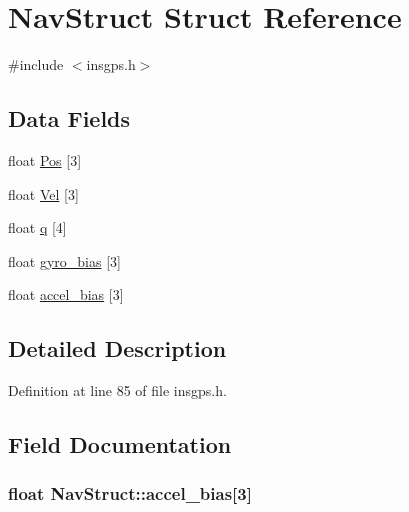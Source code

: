 \hypertarget{struct_nav_struct}{\section{Nav\-Struct Struct Reference}
\label{struct_nav_struct}
}


{\ttfamily \#include $<$insgps.\-h$>$}

\subsection*{Data Fields}
\begin{DoxyCompactItemize}
\item 
float \hyperlink{struct_nav_struct_aedabeb0b4afabbf684e440bb5f3befee}{Pos} \mbox{[}3\mbox{]}
\item 
float \hyperlink{struct_nav_struct_a0bb53e4e617d7bae88f060151d1951d3}{Vel} \mbox{[}3\mbox{]}
\item 
float \hyperlink{struct_nav_struct_a43b4e16c71db697af873a35b8f577aab}{q} \mbox{[}4\mbox{]}
\item 
float \hyperlink{struct_nav_struct_a9c9000672764dadcd54b2aec7ba67d15}{gyro\-\_\-bias} \mbox{[}3\mbox{]}
\item 
float \hyperlink{struct_nav_struct_a535e085b6bc325034bb7164c8af739cf}{accel\-\_\-bias} \mbox{[}3\mbox{]}
\end{DoxyCompactItemize}


\subsection{Detailed Description}


Definition at line 85 of file insgps.\-h.



\subsection{Field Documentation}
\hypertarget{struct_nav_struct_a535e085b6bc325034bb7164c8af739cf}{
\subsubsection[{accel\-\_\-bias}]{\setlength{\rightskip}{0pt plus 5cm}float Nav\-Struct\-::accel\-\_\-bias\mbox{[}3\mbox{]}}}\label{struct_nav_struct_a535e085b6bc325034bb7164c8af739cf}


